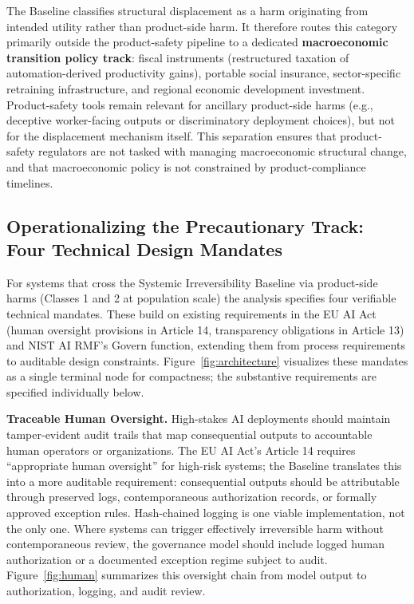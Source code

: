 \documentclass[11pt]{article}
\begin{document}
The Baseline classifies structural displacement as a harm originating from intended utility rather than product-side harm. It therefore routes this category primarily outside the product-safety pipeline to a dedicated \textbf{macroeconomic transition policy track}: fiscal instruments (restructured taxation of automation-derived productivity gains), portable social insurance, sector-specific retraining infrastructure, and regional economic development investment. Product-safety tools remain relevant for ancillary product-side harms (e.g., deceptive worker-facing outputs or discriminatory deployment choices), but not for the displacement mechanism itself. This separation ensures that product-safety regulators are not tasked with managing macroeconomic structural change, and that macroeconomic policy is not constrained by product-compliance timelines.

\subsection{Operationalizing the Precautionary Track: Four Technical Design Mandates}

For systems that cross the Systemic Irreversibility Baseline via product-side harms (Classes 1 and 2 at population scale) the analysis specifies four verifiable technical mandates. These build on existing requirements in the EU AI Act (human oversight provisions in Article 14, transparency obligations in Article 13) and NIST AI RMF's Govern function, extending them from process requirements to auditable design constraints. Figure~\ref{fig:architecture} visualizes these mandates as a single terminal node for compactness; the substantive requirements are specified individually below.

\textbf{Traceable Human Oversight.} High-stakes AI deployments should maintain tamper-evident audit trails that map consequential outputs to accountable human operators or organizations. The EU AI Act's Article 14 requires ``appropriate human oversight'' for high-risk systems; the Baseline translates this into a more auditable requirement: consequential outputs should be attributable through preserved logs, contemporaneous authorization records, or formally approved exception rules. Hash-chained logging is one viable implementation, not the only one. Where systems can trigger effectively irreversible harm without contemporaneous review, the governance model should include logged human authorization or a documented exception regime subject to audit. Figure~\ref{fig:human} summarizes this oversight chain from model output to authorization, logging, and audit review.
\end{document}
